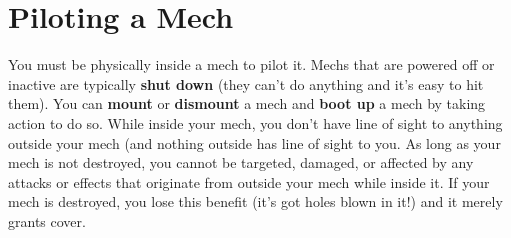 \section{Piloting a Mech}

You must be physically inside a mech to pilot it. Mechs that are powered off or inactive are typically \textbf{shut down} (they can't do anything and it's easy to hit them). You can \textbf{mount} or \textbf{dismount} a mech and \textbf{boot up} a mech by taking action to do so. While inside your mech, you don't have line of sight to anything outside your mech (and nothing outside has line of sight to you. As long as your mech is not destroyed, you cannot be targeted, damaged, or affected by any attacks or effects that originate from outside your mech while inside it. If your mech is destroyed, you lose this benefit (it's got holes blown in it!) and it merely grants cover.
